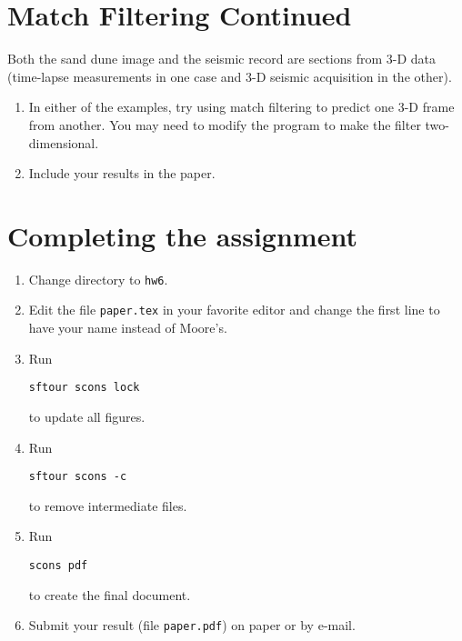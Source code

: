 \newpage

\lstset{language=python,numbers=left,numberstyle=\tiny,showstringspaces=false}


\newpage

\section{Match Filtering Continued}

Both the sand dune image and the seismic record are sections from 3-D
data (time-lapse measurements in one case and 3-D seismic acquisition
in the other).
\begin{enumerate}
\item In either of the examples, try using match filtering to
predict one 3-D frame from another. You may need to modify the program
to make the filter two-dimensional. 
\item Include your results in the paper.
\end{enumerate}


\section{Completing the assignment}

\begin{enumerate}
\item Change directory to \texttt{hw6}.
\item Edit the file \texttt{paper.tex} in your favorite editor and change the
  first line to have your name instead of Moore's.
\item Run
\begin{verbatim}
sftour scons lock
\end{verbatim}
to update all figures.
\item Run
\begin{verbatim}
sftour scons -c
\end{verbatim}
to remove intermediate files.
\item Run
\begin{verbatim}
scons pdf
\end{verbatim}
to create the final document.
\item Submit your result (file \texttt{paper.pdf}) on paper or by
e-mail.
\end{enumerate}


